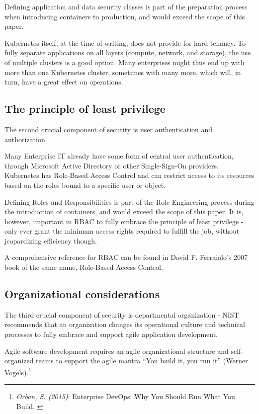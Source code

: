 Defining application and data security classes is part of the preparation process when introducing containers to production, and would exceed the scope of this paper.

Kubernetes itself, at the time of writing, does not provide for hard tenancy. To fully separate applications on all layers (compute, network, and storage), the use of multiple clusters is a good option. Many enterprises might thus end up with more than one Kubernetes cluster, sometimes with many more, which will, in turn, have a great effect on operations.

\subsection{The principle of least privilege}

The second crucial component of security is user authentication and authorization.

Many Enterprise IT already have some form of central user authentication, through Microsoft Active Directory or other Single-Sign-On providers. Kubernetes has Role-Based Access Control and can restrict access to its resources based on the roles bound to a specific user or object.

Defining Roles and Responsibilities is part of the Role Engineering process during the introduction of containers, and would exceed the scope of this paper. It is, however, important in RBAC to fully embrace the principle of least privilege - only ever grant the minimum access rights required to fulfill the job, without jeopardizing efficiency though. 

A comprehensive reference for RBAC can be found in David F. Ferraiolo's 2007 book of the same name, Role-Based Access Control\cite{rbac}.

\subsection{Organizational considerations}

The third crucial component of security is departmental organization - NIST recommends that an organization changes its operational culture and technical processes to fully embrace and support agile application development.

Agile software development requires an agile organizational structure and self-organized teams to support the agile mantra “You build it, you run it” (Werner Vogels).\footnote{\textit{Orban, S. (2015)}: Enterprise DevOps: Why You Should Run What You Build. \cite{devOps}}

